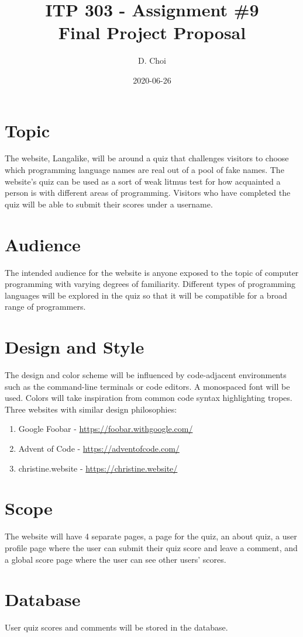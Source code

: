 \documentclass[12pt]{article}
\title{\vspace{-4\baselineskip}ITP 303 - Assignment \#9 \\
Final Project Proposal}
\author{D. Choi}
\date{2020-06-26}
\begin{document}
\maketitle

\section*{Topic}
The website, Langalike, will be around a quiz that challenges visitors to
choose which programming language names are real out of a pool of fake names.
The website's quiz can be used as a sort of weak litmus test for how
acquainted a person is with different areas of programming.
Visitors who have completed the quiz will be able to submit their scores under
a username.

\section*{Audience}
The intended audience for the website is anyone exposed to the topic of
computer programming with varying degrees of familiarity. Different types
of programming languages will be explored in the quiz so that it will be
compatible for a broad range of programmers.

\section*{Design and Style}
The design and color scheme will be influenced by code-adjacent environments
such as the command-line terminals or code editors. A monospaced font will be
used. Colors will take inspiration from common code syntax highlighting
tropes. \\[\baselineskip]
Three websites with similar design philosophies:
\begin{enumerate}
	\item Google Foobar - \url{https://foobar.withgoogle.com/}
	\item Advent of Code - \url{https://adventofcode.com/}
	\item christine.website - \url{https://christine.website/}
\end{enumerate}
\newpage

\section*{Scope}
The website will have 4 separate pages, a page for the quiz, an about quiz,
a user profile page where the user can submit their quiz score and leave a
comment, and a global score page where the user can see other users' scores.

\section*{Database}
User quiz scores and comments will be stored in the database.
\end{document}
